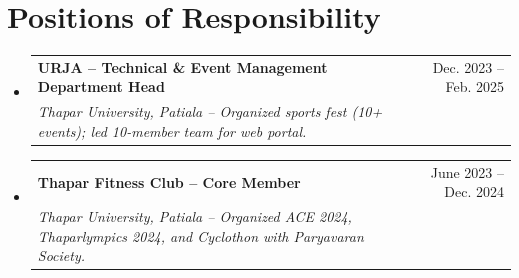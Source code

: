 \documentclass[letterpaper,9.5pt]{article}
\makeatletter
\newcommand{\resumeSubheading}[4]{
  \vspace{-2.5pt}\item
    \begin{tabular*}{\textwidth}[t]{l@{\extracolsep{\fill}}r}
      \textbf{#1} & #2 \\
      \textit{\small#3} & \textit{\small #4} \\
    \end{tabular*}\vspace{-6pt}
}
\newcommand{\resumeSubHeadingListStart}{\begin{itemize}[leftmargin=*, label={}, itemsep=1pt, topsep=0pt]}
\newcommand{\resumeSubHeadingListEnd}{\end{itemize}\vspace{-3pt}}
\makeatother
\begin{document}
\section{Positions of Responsibility}
  \resumeSubHeadingListStart
    \resumeSubheading
      {URJA -- Technical \& Event Management Department Head}{Dec. 2023 -- Feb. 2025}
      {Thapar University, Patiala -- Organized sports fest (10+ events); led 10-member team for web portal.}{}
    \resumeSubheading
      {Thapar Fitness Club -- Core Member}{June 2023 -- Dec. 2024}
      {Thapar University, Patiala -- Organized ACE 2024, Thaparlympics 2024, and Cyclothon with Paryavaran Society.}{}
  \resumeSubHeadingListEnd
\end{document}
